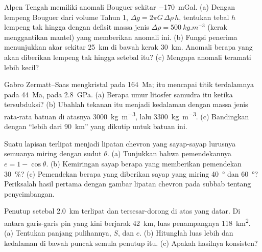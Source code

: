 \begin{exercise}[$\star\star$]\label{exo:b2:alpine-orogen:5}
Alpen Tengah memiliki anomali Bouguer sekitar \qty{-170}{mGal}. (a) Dengan lempeng
Bouguer dari volume Tahun 1, $\Delta g = 2\pi G\,\Delta\rho\,h$, tentukan tebal $h$ lempeng
tak hingga dengan defisit massa jenis $\Delta\rho = \qty{500}{kg.m^{-3}}$ (kerak menggantikan mantel)
yang memberikan anomali ini. (b) Fungsi penerima menunjukkan akar sekitar \qty{25}{km} di bawah kerak
\qty{30}{km}. Anomali berapa yang akan diberikan lempeng tak hingga setebal itu? (c) Mengapa
anomali teramati lebih kecil?
\end{exercise}

\begin{exercise}[$\star\star$]\label{exo:b2:alpine-orogen:6}
Gabro  Zermatt--Saas mengkristal pada \qty{164}{Ma};  itu mencapai
titik terdalamnya pada \qty{44}{Ma}, pada \qty{2.8}{GPa}. (a) Berapa umur litosfer samudra
itu ketika tersubduksi? (b) Ubahlah tekanan itu menjadi kedalaman dengan massa jenis rata-rata batuan di atasnya
\qty{3000}{kg.m^{-3}}, lalu \qty{3300}{kg.m^{-3}}. (c) Bandingkan dengan
``lebih dari \qty{90}{km}'' yang dikutip untuk batuan ini.
\end{exercise}

\begin{exercise}[$\star\star$]\label{exo:b2:alpine-orogen:7}
Suatu lapisan terlipat menjadi lipatan chevron yang sayap-sayap lurusnya semuanya miring dengan sudut $\theta$.
(a) Tunjukkan bahwa pemendekannya $e = 1 - \cos\theta$. (b) Kemiringan sayap berapa yang memberikan
pemendekan \qty{30}{\percent}? (c) Pemendekan berapa yang diberikan sayap yang miring \qty{40}{\degree} dan
\qty{60}{\degree}? Periksalah hasil pertama dengan gambar lipatan chevron pada subbab tentang penyeimbangan.
\end{exercise}

\begin{exercise}[$\star\star$]\label{exo:b2:alpine-orogen:8}
Penutup setebal \qty{2.0}{km} terlipat dan tersesar-dorong di atas  yang datar. Di antara garis-garis pin
yang kini berjarak \qty{42}{km}, luas penampangnya \qty{118}{km^2}. (a) Tentukan panjang
pulihannya, $S$, dan $e$. (b) Hitunglah luas lebih dan kedalaman  di bawah
puncak semula penutup itu. (c) Apakah hasilnya konsisten?
\end{exercise}

